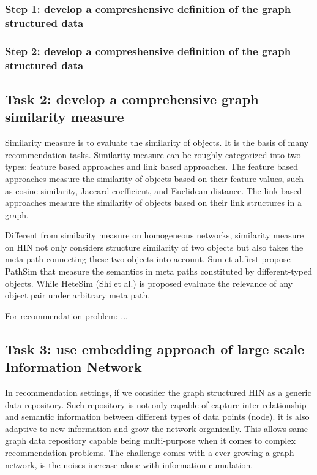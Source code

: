 \documentclass[12pt,a4 paper,title page]{article}
\begin{document}
\subsubsection*{Step 1: develop a compreshensive definition of the graph structured data}

\subsubsection*{Step 2: develop a compreshensive definition of the graph structured data}



\subsection{Task 2: develop a comprehensive graph similarity measure}

Similarity measure is to evaluate the similarity of objects. It is the basis of many recommendation tasks. Similarity measure can be roughly categorized into two types: feature based approaches and link based approaches. The feature based approaches measure the similarity of objects based on their feature values, such as cosine similarity, Jaccard coefficient, and Euclidean distance. The link based approaches measure the similarity of objects based on their link structures in a graph.

Different from similarity measure on homogeneous networks, similarity measure on HIN not only considers structure similarity of two objects but also takes the meta path connecting these two objects into account. Sun et al.first propose PathSim that measure the semantics in meta paths constituted by different-typed objects. While HeteSim (Shi et al.) is proposed evaluate the relevance of any object pair under arbitrary meta path.

For recommendation problem: ...


\subsection{Task 3: use embedding approach of large scale Information Network}

In recommendation settings, if we consider the graph structured HIN as a generic data repository. Such repository is not only capable of capture inter-relationship and semantic information between different types of data points (node). it is also adaptive to new information and grow the network organically. This allows same graph data repository capable being multi-purpose when it comes to complex recommendation problems. The challenge comes with a ever growing a graph network, is the noises increase alone with information cumulation.
\end{document}
